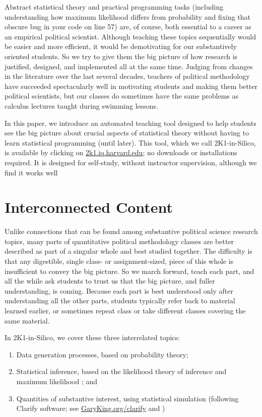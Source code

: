 \documentclass[12pt]{article}
\theoremstyle{definition}
\begin{document}
Abstract statistical theory and practical programming tasks (including understanding how maximum likelihood differs from probability and fixing that obscure bug in your code on line 57) are, of course, both essential to a career as an empirical political scientist. Although teaching these topics sequentially would be easier and more efficient, it would be demotivating for our substantively oriented students. So we try to give them the big picture of how research is justified, designed, and implemented all at the same time. Judging from changes in the literature over the last several decades, teachers of political methodology have succeeded spectacularly well in motivating students and making them better political scientists, but our classes do sometimes have the same problems as calculus lectures taught during swimming lessons.

In this paper, we introduce an automated teaching tool designed to help students see the big picture about crucial aspects of statistical theory without having to learn statistical programming (until later).  This tool, which we call 2K1-in-Silico, is available by clicking on \href{https://2k1.iq.harvard.edu}{2k1.iq.harvard.edu}; no downloads or installations required.  It is designed for self-study, without instructor supervision, although we find it works well

\section{Interconnected Content}

Unlike connections that can be found among substantive political science research topics, many parts of quantitative political methodology classes are better described as part of a singular whole and best studied together. The difficulty is that any digestible, single class- or assignment-sized, piece of this whole is insufficient to convey the big picture. So we march forward, teach each part, and all the while ask students to trust us that the big picture, and fuller understanding, is coming. Because each part is best understood only after understanding all the other parts, students typically refer back to material learned earlier, or sometimes repeat class or take different classes covering the same material. 

In 2K1-in-Silico, we cover these three interrelated topics:
\begin{enumerate}
 \item Data generation processes, based on probability theory;
 \item Statistical inference, based on the likelihood theory of inference and maximum likelihood \citep{King98}; and
 \item Quantities of substantive interest, using statistical simulation (following Clarify software; see \href{https://GaryKing.org/clarify}{GaryKing.org/clarify} and \citealt{KinTomWit00b})
\end{enumerate}
\end{document}
